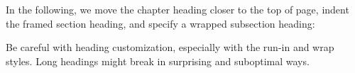 In the following, we move the chapter heading closer to the top of page,
indent the framed section heading, and specify a wrapped subsection heading:
%
%


\begin{warning}
Be careful with heading customization, especially with the run-in and wrap styles.
Long headings might break in surprising and suboptimal ways.
\end{warning}
